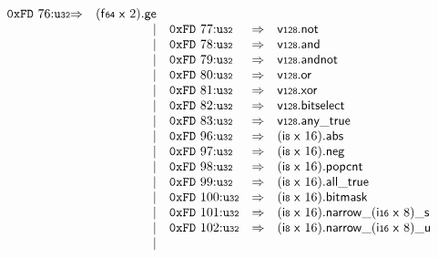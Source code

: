$$\begin{array}{@{}l@{}rrlll@{}l@{}}
\mathtt{0xFD}~76{:}{\mathtt{u{\scriptstyle32}}} &\Rightarrow& (\mathsf{f{\scriptstyle64}}~\mathsf{x}~2) . \mathsf{ge} \\ &&|&
\mathtt{0xFD}~77{:}{\mathtt{u{\scriptstyle32}}} &\Rightarrow& \mathsf{v{\scriptstyle128}} . \mathsf{not} \\ &&|&
\mathtt{0xFD}~78{:}{\mathtt{u{\scriptstyle32}}} &\Rightarrow& \mathsf{v{\scriptstyle128}} . \mathsf{and} \\ &&|&
\mathtt{0xFD}~79{:}{\mathtt{u{\scriptstyle32}}} &\Rightarrow& \mathsf{v{\scriptstyle128}} . \mathsf{andnot} \\ &&|&
\mathtt{0xFD}~80{:}{\mathtt{u{\scriptstyle32}}} &\Rightarrow& \mathsf{v{\scriptstyle128}} . \mathsf{or} \\ &&|&
\mathtt{0xFD}~81{:}{\mathtt{u{\scriptstyle32}}} &\Rightarrow& \mathsf{v{\scriptstyle128}} . \mathsf{xor} \\ &&|&
\mathtt{0xFD}~82{:}{\mathtt{u{\scriptstyle32}}} &\Rightarrow& \mathsf{v{\scriptstyle128}} . \mathsf{bitselect} \\ &&|&
\mathtt{0xFD}~83{:}{\mathtt{u{\scriptstyle32}}} &\Rightarrow& \mathsf{v{\scriptstyle128}} . \mathsf{any\_true} \\ &&|&
\mathtt{0xFD}~96{:}{\mathtt{u{\scriptstyle32}}} &\Rightarrow& (\mathsf{i{\scriptstyle8}}~\mathsf{x}~16) . \mathsf{abs} \\ &&|&
\mathtt{0xFD}~97{:}{\mathtt{u{\scriptstyle32}}} &\Rightarrow& (\mathsf{i{\scriptstyle8}}~\mathsf{x}~16) . \mathsf{neg} \\ &&|&
\mathtt{0xFD}~98{:}{\mathtt{u{\scriptstyle32}}} &\Rightarrow& (\mathsf{i{\scriptstyle8}}~\mathsf{x}~16) . \mathsf{popcnt} \\ &&|&
\mathtt{0xFD}~99{:}{\mathtt{u{\scriptstyle32}}} &\Rightarrow& (\mathsf{i{\scriptstyle8}}~\mathsf{x}~16) . \mathsf{all\_true} \\ &&|&
\mathtt{0xFD}~100{:}{\mathtt{u{\scriptstyle32}}} &\Rightarrow& (\mathsf{i{\scriptstyle8}}~\mathsf{x}~16).\mathsf{bitmask} \\ &&|&
\mathtt{0xFD}~101{:}{\mathtt{u{\scriptstyle32}}} &\Rightarrow& {{{{(\mathsf{i{\scriptstyle8}}~\mathsf{x}~16).\mathsf{narrow}}{\mathsf{\_}}}{(\mathsf{i{\scriptstyle16}}~\mathsf{x}~8)}}{\mathsf{\_}}}{\mathsf{s}} \\ &&|&
\mathtt{0xFD}~102{:}{\mathtt{u{\scriptstyle32}}} &\Rightarrow& {{{{(\mathsf{i{\scriptstyle8}}~\mathsf{x}~16).\mathsf{narrow}}{\mathsf{\_}}}{(\mathsf{i{\scriptstyle16}}~\mathsf{x}~8)}}{\mathsf{\_}}}{\mathsf{u}} \\ &&|&

\end{array}$$
